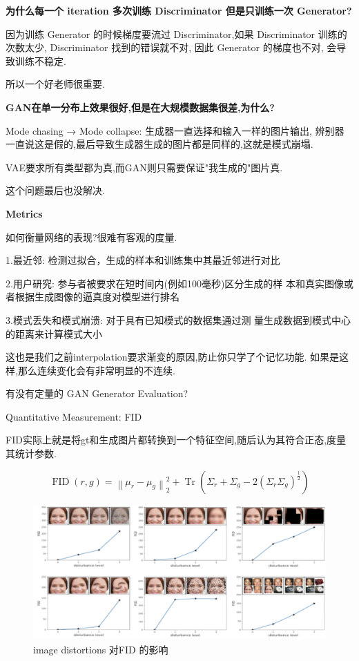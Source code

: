 	\textbf{为什么每一个 iteration 多次训练 Discriminator 但是只训练一次 Generator?}

	因为训练 Generator 的时候梯度要流过 Discriminator,如果 Discriminator 训练的次数太少,
	Discriminator 找到的错误就不对, 因此 Generator 的梯度也不对, 会导致训练不稳定.

	所以一个好老师很重要.

	\textbf{GAN在单一分布上效果很好,但是在大规模数据集很差,为什么?}

	Mode chasing → Mode collapse: 生成器一直选择和输入一样的图片输出,
	辨别器一直说这是假的,最后导致生成器生成的图片都是同样的,这就是模式崩塌.

	VAE要求所有类型都为真,而GAN则只需要保证"我生成的"图片真.
	
	这个问题最后也没解决.

	\textbf{Metrics}

	如何衡量网络的表现?很难有客观的度量.
	
	1.最近邻: 检测过拟合，生成的样本和训练集中其最近邻进行对比

	2.用户研究: 参与者被要求在短时间内(例如100毫秒)区分生成的样
	本和真实图像或者根据生成图像的逼真度对模型进行排名 

	3.模式丢失和模式崩溃: 对于具有已知模式的数据集通过测
	量生成数据到模式中心的距离来计算模式大小
	
	这也是我们之前interpolation要求渐变的原因,防止你只学了个记忆功能.
	如果是这样,那么连续变化会有非常明显的不连续.
	
	有没有定量的 GAN Generator Evaluation?

	Quantitative Measurement: FID
	
	FID实际上就是将gt和生成图片都转换到一个特征空间,随后认为其符合正态,度量其统计参数.
	
	\begin{equation}
		\operatorname{FID}(r, g)=\left\|\mu_{r}-\mu_{g}\right\|_{2}^{2}+\operatorname{Tr}\left(\Sigma_{r}+\Sigma_{g}-2\left(\Sigma_{r} \Sigma_{g}\right)^{\frac{1}{2}}\right)
	\end{equation}

	\begin{figure}[htbp]
		\centering
		\includegraphics[scale=0.3]{figures/fid.png}
		\caption{image distortions 对FID 的影响}
		\label{fig:fid}
	\end{figure}

